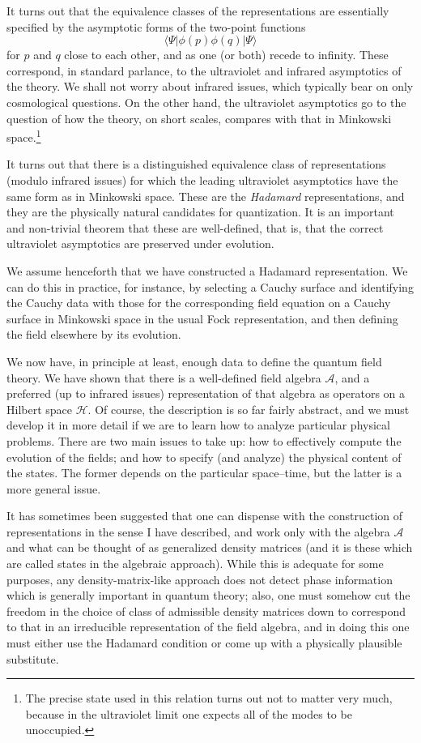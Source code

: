 \documentclass[
%
draft    %
,numberedheadings 
,bibliocites
  ]
  {aipproc}
\newcommand{\A}{{\mathcal A}}
\newcommand{\HH}{{\mathcal H}}
\begin{document}
It turns out that the equivalence classes of the representations are essentially specified by the asymptotic forms of the two-point functions
\begin{equation}
  \langle\Psi | \phi (p)\phi (q) |\Psi\rangle
\end{equation}
for $p$ and $q$ close to each other, and as one (or both) recede to infinity.
These correspond, in standard parlance, to the ultraviolet and infrared asymptotics of the theory.  We shall not worry about infrared issues, which typically bear on only cosmological questions.  On the other hand, the ultraviolet asymptotics go to the question of how the theory, on short scales, compares with that in Minkowski space.\footnote{The precise state used in this relation turns out not to matter very much, because in the ultraviolet limit one expects all of the modes to be unoccupied.}

It turns out that there is a distinguished equivalence class of representations (modulo infrared issues) for which the leading ultraviolet asymptotics have the same form as in Minkowski space.  These are the {\em Hadamard} representations, and they are the physically natural candidates for quantization.  It is an important and non-trivial theorem that these are well-defined, that is, that the correct ultraviolet asymptotics are preserved under evolution.

We assume henceforth that we have constructed a Hadamard representation.  We can do this in practice, for instance, by selecting a Cauchy surface and identifying the Cauchy data with those for the corresponding field equation on a Cauchy surface in Minkowski space in the usual Fock representation, and then defining the field elsewhere by its evolution.  
  
We now have, in principle at least, enough data to define the quantum field theory.  We have shown that there is a well-defined field algebra $\A$, and a preferred (up to infrared issues) representation of that algebra as operators on a Hilbert space $\HH$.  Of course, the description is so far fairly abstract, and we must develop it in more detail if we are to learn how to analyze particular physical problems.
There are two main issues to  take up:  how to effectively compute the evolution of the fields; and how to specify (and analyze) the physical content of the states.  The former depends on the particular space--time, but the latter is a more general issue.

It has sometimes been suggested that one can dispense with the construction of representations in the sense I have described, and
work only with the algebra $\A$ and what can be thought of as generalized density matrices (and it is these which are called states in the algebraic approach).  While this is adequate for some purposes, any density-matrix-like approach does not detect phase information which is generally important in quantum theory; also, one must somehow cut the freedom in the choice of class of admissible density matrices down to correspond to that in an irreducible representation of the field algebra, and in doing this one must either use the Hadamard condition or come up with a physically plausible substitute.
\end{document}
